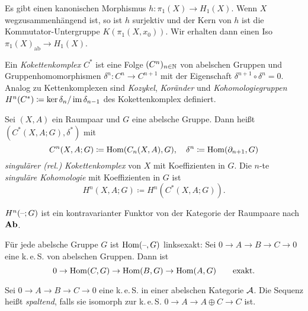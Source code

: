\documentclass{cheat-sheet}
\newcommand{\keS}{k.\,e.\,S.} %
\begin{document}

\begin{prop}
  Es gibt einen kanonischen Morphismus $h : \pi_1(X) \to H_1(X)$. Wenn $X$ wegzusammenhängend ist, so ist $h$ surjektiv und der Kern von $h$ ist die Kommutator-Untergruppe $K(\pi_1(X, x_0))$. Wir erhalten dann einen Iso $\pi_1(X)_{\text{ab}} \to H_1(X)$.
\end{prop}



\begin{defn}
  Ein \emph{Kokettenkomplex} $C^*$ ist eine Folge $(C^n)_{n \in \mathbb{N}}$ von abelschen Gruppen und Gruppenhomomorphismen $\delta^n : C^n \to C^{n+1}$ mit der Eigenschaft $\delta^{n+1} \circ \delta^n = 0$. Analog zu Kettenkomplexen sind \emph{Kozykel}, \emph{Koränder} und \emph{Kohomologiegruppen} $H^n(C^*) \coloneqq \ker \delta_n / \operatorname{im} \delta_{n-1}$ des Kokettenkomplex definiert.
\end{defn}

\begin{defn}
  Sei $(X, A)$ ein Raumpaar und $G$ eine abelsche Gruppe. Dann heißt $(C^*(X, A; G), \delta^*)$ mit
  \[
    C^n(X, A; G) \coloneqq \operatorname{Hom}(C_n(X, A), G), \quad
    \delta^n \coloneqq \operatorname{Hom}(\partial_{n+1}, G)
  \]
  \emph{singulärer (rel.) Kokettenkomplex} von $X$ mit Koeffizienten in $G$. Die $n$-te \emph{singuläre Kohomologie} mit Koeffizienten in $G$ ist
  \[ H^n(X, A; G) \coloneqq H^n(C^*(X, A; G)). \]
\end{defn}

\begin{nota}
   \quad
\end{nota}

\begin{bem}
  $H^n(\text{--}; G)$ ist ein kontravarianter Funktor von der Kategorie der Raumpaare nach $\mathbf{Ab}$.
\end{bem}

\begin{lem}
  Für jede abelsche Gruppe $G$ ist $\operatorname{Hom}(\text{--}, G)$ linksexakt:
  Sei $0 \to A \to B \to C \to 0$ eine \keS{} von abelschen Gruppen. Dann ist
  \[
    0 \to \operatorname{Hom}(C, G) \to \operatorname{Hom}(B, G) \to \operatorname{Hom}(A, G)
    \qquad \text{exakt.}
  \]
\end{lem}

\begin{defn}
  Sei $0 \to A \to B \to C \to 0$ eine \keS{} in einer abelschen Kategorie $\mathcal{A}$. Die Sequenz heißt \emph{spaltend}, falls sie isomorph zur \keS{} $0 \to A \to A \oplus C \to C$ ist.
\end{defn}
\end{document}

